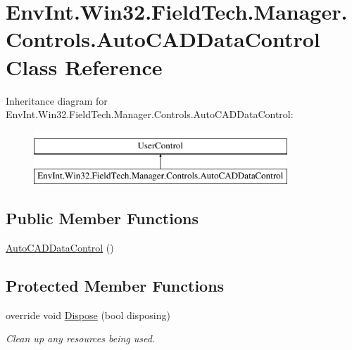 \hypertarget{class_env_int_1_1_win32_1_1_field_tech_1_1_manager_1_1_controls_1_1_auto_c_a_d_data_control}{}\section{Env\+Int.\+Win32.\+Field\+Tech.\+Manager.\+Controls.\+Auto\+C\+A\+D\+Data\+Control Class Reference}
\label{class_env_int_1_1_win32_1_1_field_tech_1_1_manager_1_1_controls_1_1_auto_c_a_d_data_control}
Inheritance diagram for Env\+Int.\+Win32.\+Field\+Tech.\+Manager.\+Controls.\+Auto\+C\+A\+D\+Data\+Control\+:\begin{figure}[H]
\begin{center}
\leavevmode
\includegraphics[height=2.000000cm]{class_env_int_1_1_win32_1_1_field_tech_1_1_manager_1_1_controls_1_1_auto_c_a_d_data_control}
\end{center}
\end{figure}
\subsection*{Public Member Functions}
\begin{DoxyCompactItemize}
\item 
\hyperlink{class_env_int_1_1_win32_1_1_field_tech_1_1_manager_1_1_controls_1_1_auto_c_a_d_data_control_a10d4263bc97f6a401df5122a4eda8573}{Auto\+C\+A\+D\+Data\+Control} ()
\end{DoxyCompactItemize}
\subsection*{Protected Member Functions}
\begin{DoxyCompactItemize}
\item 
override void \hyperlink{class_env_int_1_1_win32_1_1_field_tech_1_1_manager_1_1_controls_1_1_auto_c_a_d_data_control_a1078f7ddd7c3a20ec9933422f333f71f}{Dispose} (bool disposing)
\begin{DoxyCompactList}\small\item\em Clean up any resources being used. \end{DoxyCompactList}\end{DoxyCompactItemize}


